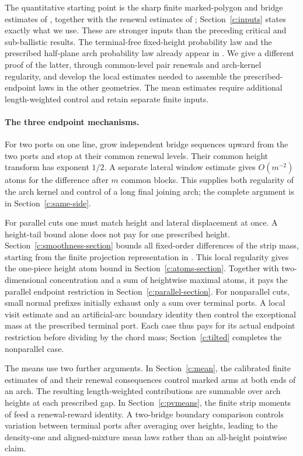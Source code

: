 The quantitative starting point is the sharp finite marked-polygon and
bridge estimates of \cite{UniformMarked}, together with the renewal
estimates of \cite{Renewal}; Section~\ref{c:inputs} states exactly what
we use. These are stronger inputs than the preceding critical and
sub-ballistic results. The terminal-free fixed-height probability law
and the prescribed half-plane arch probability law already appear in
\cite[Propositions 5.7 and 5.8]{Renewal}. We give a different proof of the
latter, through common-level pair renewals and arch-kernel regularity,
and develop the local estimates needed to assemble the prescribed-endpoint
laws in the other geometries. The mean estimates require additional
length-weighted control and retain separate finite inputs.

\paragraph{The three endpoint mechanisms.}
For two ports on one line, grow independent bridge sequences upward from
the two ports and stop at their common renewal levels. Their common
height transform has exponent $1/2$. A separate lateral window estimate
gives $O(m^{-2})$ atoms for the difference after $m$ common blocks. This supplies both regularity
of the arch kernel and control of a long final joining arch; the complete
argument is in Section~\ref{c:same-side}.

For parallel cuts one must match height and lateral displacement at once.
A height-tail bound alone does not pay for one prescribed height.
Section~\ref{c:smoothness-section} bounds all fixed-order differences of
the strip mass, starting from the finite projection representation in
\cite{UniformMarked}. This local regularity gives the one-piece height
atom bound in Section~\ref{c:atoms-section}. Together with two-dimensional
concentration and a sum of heightwise maximal atoms, it pays the parallel
endpoint restriction in Section~\ref{c:parallel-section}.
For nonparallel cuts, small normal prefixes
initially exhaust only a sum over terminal ports. A local visit estimate
and an artificial-arc boundary identity then control the exceptional
mass at the prescribed terminal port. Each case thus pays for its actual
endpoint restriction before dividing by the chord mass;
Section~\ref{c:tilted} completes the nonparallel case.

The means use two further arguments. In Section~\ref{c:mean}, the
calibrated finite estimates of \cite{Calibrated} and their renewal
consequences control marked arms at both ends of an arch. The resulting
length-weighted contributions are summable over arch heights at each
prescribed gap. In Section~\ref{c:pvmeans},
the finite strip moments of \cite{PolynomialVacuum} feed a renewal-reward
identity. A two-bridge boundary comparison controls variation between
terminal ports after averaging over heights, leading to the density-one
and aligned-mixture mean laws rather than an all-height pointwise claim.
